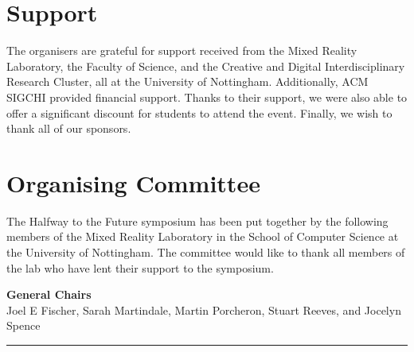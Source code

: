 \documentclass[a4paper,oneside]{memoir}
\begin{document}
\section{Support}
The organisers are grateful for support received from the Mixed Reality Laboratory, the Faculty of Science, and the Creative and Digital Interdisciplinary Research Cluster, all at the University of Nottingham.
Additionally, ACM SIGCHI provided financial support. Thanks to their support, we were also able to offer a significant discount for students to attend the event. Finally, we wish to thank all of our sponsors.


\section{Organising Committee}

The Halfway to the Future symposium has been put together by the following members of the Mixed Reality Laboratory in the School of Computer Science at the University of Nottingham. The committee would like to thank all members of the lab who have lent their support to the symposium.

\vspace{.5cm}

\noindent\textbf{General Chairs}\\
Joel E Fischer, Sarah Martindale, Martin Porcheron, Stuart Reeves, and  Jocelyn Spence

\vspace*{.75cm}\hrule\vspace{.5cm}
\end{document}
